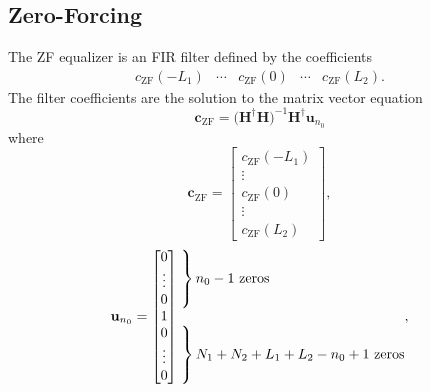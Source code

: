 \subsection{Zero-Forcing}
\label{sec:zero-forcing}
The ZF equalizer is an FIR filter defined by the coefficients
\begin{equation}
\begin{matrix}
c_\text{ZF}(-L_1) & \cdots & c_\text{ZF}(0) & \cdots & c_\text{ZF}(L_2).
\end{matrix}
\end{equation}
The filter coefficients are the solution to the matrix vector equation \cite[eq. (311)]{PAQ-phase1}
\begin{equation}
\mathbf{c}_\text{ZF} = \big(\mathbf{H}^\dagger\mathbf{H}\big)^{-1} \mathbf{H}^\dagger \mathbf{u}_{n_0}
\label{eq:c_ZF_direct}
\end{equation}
where
\begin{equation}
\mathbf{c}_\text{ZF} = 
\begin{bmatrix}
c_\text{ZF}(-L_1) \\ \vdots \\ c_\text{ZF}(0) \\ \vdots \\ c_\text{ZF}(L_2)
\end{bmatrix},
\end{equation}
\begin{equation}
\mathbf{u}_{n_0} = \begin{bmatrix} 0 \\ \vdots \\ 0 \\ 1 \\ 0 \\ \vdots \\ 0 \end{bmatrix}
	\begin{matrix*}[l] \left. \vphantom{\begin{matrix} 0 \\ \vdots \\ 0 \end{matrix}} \right\}
		\text{$n_0-1$ zeros}
		\\ \\
		\left. \vphantom{\begin{matrix} 0 \\ \vdots \\ 0 \end{matrix}} \right\}
		\text{$N_1+N_2+L_1+L_2-n_0+1$ zeros}
		\end{matrix*},
		\label{eq:un0_ZF}
\end{equation}
